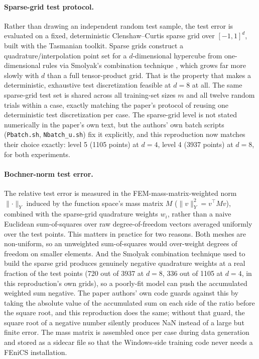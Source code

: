 \paragraph{Sparse-grid test protocol.} Rather than drawing an independent
random test sample, the test error is evaluated on a fixed, deterministic
Clenshaw--Curtis sparse grid \cite{clenshawcurtis1960} over $[-1,1]^d$,
built with the Tasmanian toolkit. Sparse grids construct a
quadrature/interpolation point set for a $d$-dimensional hypercube from
one-dimensional rules via Smolyak's combination technique
\cite{smolyak1963}, which grows far more slowly with $d$ than a full
tensor-product grid. That is the property that makes a deterministic,
exhaustive test discretization feasible at $d=8$ at all. The same
sparse-grid test set is shared across all training-set sizes $m$ and all
twelve random trials within a case, exactly matching the paper's protocol
of reusing one deterministic test discretization per case. The sparse-grid
level is not stated numerically in the paper's own text, but the authors'
own batch scripts (\texttt{Pbatch.sh}, \texttt{Nbatch\_u.sh}) fix it
explicitly, and this reproduction now matches their choice exactly: level
5 (1105 points) at $d=4$, level 4 (3937 points) at $d=8$, for both
experiments.

\paragraph{Bochner-norm test error.} The relative test error is measured in
the FEM-mass-matrix-weighted norm $\lVert \cdot \rVert_Y$ induced by the
function space's mass matrix $M$ ($\lVert v \rVert_Y^2 = v^\top M v$),
combined with the sparse-grid quadrature weights $w_i$, rather than a
naive Euclidean sum-of-squares over raw degree-of-freedom vectors averaged
uniformly over the test points. This matters in practice for two reasons.
Both meshes are non-uniform, so an unweighted sum-of-squares would
over-weight degrees of freedom on smaller elements. And the Smolyak
combination technique used to build the sparse grid produces genuinely
negative quadrature weights at a real fraction of the test points (720 out
of 3937 at $d=8$, 336 out of 1105 at $d=4$, in this reproduction's own
grids), so a poorly-fit model can push the accumulated weighted sum
negative. The paper authors' own code guards against this by taking the
absolute value of the accumulated sum on each side of the ratio before
the square root, and this reproduction does the same; without that guard,
the square root of a negative number silently produces NaN instead of a
large but finite error. The mass matrix is assembled once per case during
data generation and stored as a sidecar file so that the Windows-side
training code never needs a FEniCS installation.

